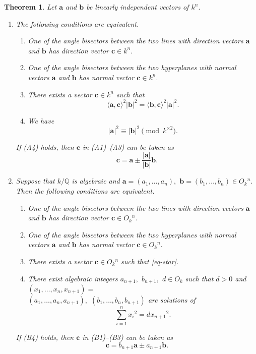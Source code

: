 \documentclass{article}
\theoremstyle{definition}
\theoremstyle{plain}
\newtheorem{thm}{Theorem}
\begin{document}
\begin{thm}\label{thm-ang}
Let $\bm{a}$ and $\bm{b}$ be linearly independent vectors of $k^n.$
\begin{enumerate}
\item[{\rm (1)}]
The following conditions are equivalent. 
\begin{enumerate}
\item[{\rm (A1)}]
One of the angle bisectors between the two lines with direction vectors $\bm{a}$ and $\bm{b}$ has direction vector $\bm{c} \in k^n.$
\item[{\rm (A2)}]
One of the angle bisectors between the two hyperplanes with normal vectors $\bm{a}$ and $\bm{b}$ has normal vector $\bm{c} \in k^n.$
\item[{\rm (A3)}]
There exists a vector $\bm{c} \in k^n$ such that 
\begin{equation} 
\langle\bm{a},\bm{c}\rangle ^2|\bm{b}|^2 = \langle\bm{b},\bm{c}\rangle ^2|\bm{a}|^2. \label{eq-star} 
\end{equation}
\item[{\rm (A4)}]
We have 
\[ |\bm{a}|^2 \equiv |\bm{b}|^2 \pmod{k^{\times 2}}.\]
\end{enumerate}
If {\rm (A4)} holds, then $\bm{c}$ in {\rm (A1)}--{\rm (A3)} can be taken as 
\begin{equation} 
\bm{c} = \bm{a}\pm\frac{|\bm{a}|}{|\bm{b}|}\bm{b}. \label{eq-c} 
\end{equation}
\item[{\rm (2)}]
Suppose that $k/\mathbb Q$ is algebraic and $\bm{a} = (a_1,\dots,a_n),$ $\bm{b} = (b_1,\dots,b_n) \in O_k{}^n.$ 
Then the following conditions are equivalent. 
\begin{enumerate}
\item[{\rm (B1)}]
One of the angle bisectors between the two lines with direction vectors $\bm{a}$ and $\bm{b}$ has direction vector $\bm{c} \in O_k{}^n.$
\item[{\rm (B2)}]
One of the angle bisectors between the two hyperplanes with normal vectors $\bm{a}$ and $\bm{b}$ has normal vector $\bm{c} \in O_k{}^n.$
\item[{\rm (B3)}]
There exists a vector $\bm{c} \in O_k{}^n$ such that \eqref{eq-star}. 
\item[{\rm (B4)}]
There exist algebraic integers $a_{n+1},$ $b_{n+1},$ $d \in O_k$ such that $d > 0$ and $(x_1,\dots,x_n,x_{n+1}) =$\\
$(a_1,\dots,a_n,a_{n+1}),$ $(b_1,\dots,b_n,b_{n+1})$ are solutions of 
\begin{equation} 
\sum_{i = 1}^nx_i{}^2 = dx_{n+1}{}^2. \label{eq-pell} 
\end{equation} 
\end{enumerate}
If {\rm (B4)} holds, then $\bm{c}$ in {\rm (B1)}--{\rm (B3)} can be taken as 
\[\bm{c} = b_{n+1}\bm{a}\pm a_{n+1}\bm{b}.\] 
\end{enumerate}
\end{thm}
\end{document}
